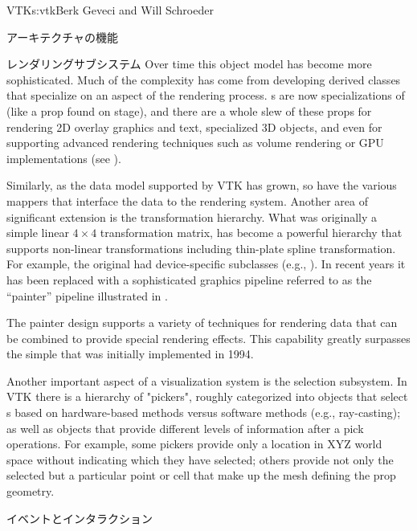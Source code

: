 \begin{aosachapter}{VTK}{s:vtk}{Berk Geveci and Will Schroeder}
\begin{aosasect1}{アーキテクチャの機能}
\begin{aosasect2}{レンダリングサブシステム}
Over time this object model has become more sophisticated. Much of the
complexity has come from developing derived classes that specialize on
an aspect of the rendering process. s are now
specializations of  (like a prop found on stage), and
there are a whole slew of these props for rendering 2D overlay
graphics and text, specialized 3D objects, and even for supporting
advanced rendering techniques such as volume rendering or GPU
implementations (see ).

Similarly, as the data model supported by VTK has grown, so have the
various mappers that interface the data to the rendering
system. Another area of significant extension is the transformation
hierarchy. What was originally a simple linear $4{\times}4$
transformation matrix, has become a powerful hierarchy that supports
non-linear transformations including thin-plate spline
transformation. For example, the original  had
device-specific subclasses (e.g., ). In
recent years it has been replaced with a sophisticated graphics
pipeline referred to as the ``painter'' pipeline illustrated in
.


The painter design supports a variety of techniques for rendering data
that can be combined to provide special rendering effects. This
capability greatly surpasses the simple  that
was initially implemented in 1994.

Another important aspect of a visualization system is the selection
subsystem. In VTK there is a hierarchy of "pickers", roughly
categorized into objects that select s based on
hardware-based methods versus software methods (e.g., ray-casting); as
well as objects that provide different levels of information after a
pick operations. For example, some pickers provide only a location in
XYZ world space without indicating which  they have
selected; others provide not only the selected  but a
particular point or cell that make up the mesh defining the prop
geometry.

\end{aosasect2}

\begin{aosasect2}{イベントとインタラクション}


\end{aosasect2}
\end{aosasect1}
\end{aosachapter}
